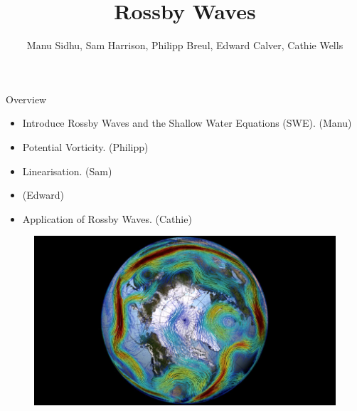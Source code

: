 \documentclass[12pt]{beamer}
\title[Rossby Waves]{Rossby Waves}
\author{Manu Sidhu, Sam Harrison, Philipp Breul, Edward Calver, Cathie Wells}
\institute{University of Reading and Imperial College London}
\begin{document}
	
	\begin{frame}
	\titlepage
\end{frame}

\begin{frame}{Overview}

\begin{itemize}
	\item Introduce Rossby Waves and the Shallow Water Equations (SWE). (Manu)
	\item Potential Vorticity. (Philipp)
	\item Linearisation. (Sam)
	\item (Edward)
	\item Application of Rossby Waves. (Cathie)
\end{itemize}

\begin{figure}[H]
	\centering
	\includegraphics[width=0.5\linewidth]{Rossby_Wave.jpg}
\end{figure}   

\end{frame}
\end{document}
